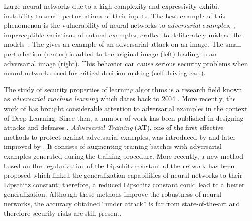 Large neural networks due to a high complexity and expressivity exhibit instability to small perturbations of their inputs.
The best example of this phenomenon is the vulnerability of neural networks to \emph{adversarial examples}, \ie, imperceptible variations of natural examples, crafted to deliberately mislead the models~\cite{globerson2006nightmare,biggio2013evasion,szegedy2013intriguing}.
The  gives an example of an adversarial attack on an image.
The small perturbation (center) is added to the original image (left) leading to an adversarial image (right).
This behavior can cause serious security problems when neural networks used for critical decision-making (\eg self-driving cars).


The study of security properties of learning algorithms is a research field known as \emph{adversarial machine learning} which dates back to 2004 \cite{dalvi2004adversarial}.
More recently, the work of \citet{szegedy2013intriguing} has brought considerable attention to adversarial examples in the context of Deep Learning.
Since then, a number of work has been published in designing attacks and defenses \cite{szegedy2013intriguing,goodfellow2014explaining,papernot2016limitations,madry2018towards,carlini2017towards,pinot2019theoretical}.
\emph{Adversarial Training} (AT), one of the first effective methods to protect against adversarial examples, was introduced by \citet{goodfellow2014explaining} and later improved by \citet{madry2018towards}.
It consists of augmenting training batches with adversarial examples generated during the training procedure.
More recently, a new method \cite{farnia2018generalizable} based on the regularization of the Lipschitz constant of the network has been proposed which linked the generalization capabilities of neural networks to their Lipschitz constant; therefore, a reduced Lipschitz constant could lead to a better generalization.
Although these methods improve the robustness of neural networks, the accuracy obtained ``under attack'' is far from state-of-the-art and therefore security risks are still present.

